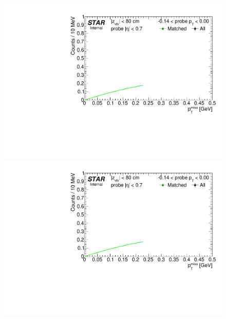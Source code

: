 \begin{figure}[h!]
{  \includegraphics[width=\linewidth,page=5]{graphics/systematicsEfficiency/TOF_tagAndProbe/Fitting_effVsPt_data.pdf}\\
  \includegraphics[width=\linewidth,page=6]{graphics/systematicsEfficiency/TOF_tagAndProbe/Fitting_effVsPt_data.pdf}

}
\end{figure}
